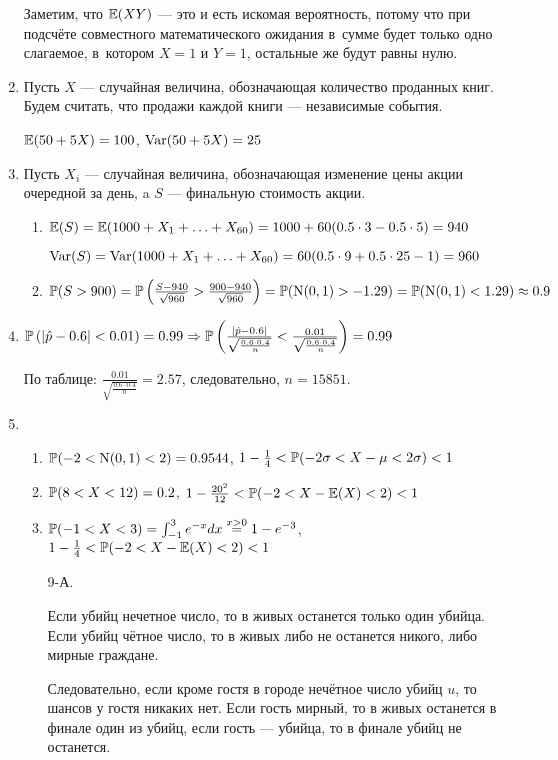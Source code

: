 \begin{enumerate}
Заметим, что $\E(XY)$ — это и есть искомая вероятность, потому что при подсчёте
совместного математического ожидания в~сумме будет только одно слагаемое, в~котором
$X = 1$ и $Y = 1$, остальные же будут равны нулю.
\item Пусть $X$ — случайная величина, обозначающая количество проданных книг.
Будем считать, что продажи каждой книги — независимые события.

$\E(50 + 5X) = 100$, $\Var(50 + 5X) = 25$
\item Пусть $X_i$ — случайная величина, обозначающая изменение цены акции очередной за день,
a $S$ —  финальную стоимость акции.
\begin{enumerate}
\item $\E(S) = \E(1000 + X_1 + \ldots + X_{60}) = 1000 + 60 (0.5 \cdot 3 - 0.5 \cdot 5) = 940$

$\Var(S) = \Var(1000 + X_1 + \ldots + X_{60}) = 60(0.5 \cdot 9 + 0.5 \cdot 25 - 1) = 960$
\item $\P(S > 900) = \P\left(\frac{S-940}{\sqrt{960}} > \frac{900-940}{\sqrt{960}} \right) =
\P(\cN(0,1) > -1.29) = \P(\cN(0, 1) < 1.29) \approx 0.9$
\end{enumerate}
\item $\P\left(|\hat{p} - 0.6| <0.01\right) = 0.99 \Rightarrow \P\left(\frac{|\hat{p}
- 0.6|}{\sqrt{\frac{0.6\cdot0.4}{n}}} < \frac{0.01}{\sqrt{\frac{0.6\cdot0.4}{n}}} \right) = 0.99 $

По таблице: $\frac{0.01}{\sqrt{\frac{0.6\cdot0.4}{n}}}  = 2.57$, следовательно, $n = 15851$.
\item
\begin{enumerate}
\item $\P(-2 < \cN(0,1) < 2) = 0.9544$, $1 - \frac{1}{4} < \P(-2\sigma<X-\mu<2\sigma) < 1$
\item $\P(8<X<12) = 0.2$, $1 - \frac{20^2}{12} < \P(-2 < X - \E(X) < 2)< 1$
\item $\P(-1 < X < 3) = \int_{-1}^{3} e^{-x} dx \stackrel{x>0}{=} 1 - e^{-3}$, $1- \frac{1}{4} < \P(-2<X-\E(X)<2) < 1$

\item[9-А.]

Если убийц нечетное число, то в живых останется только один убийца.
Если убийц чётное число, то в живых либо не останется никого, либо мирные граждане.

Следовательно, если кроме гостя в городе нечётное число убийц $u$, то шансов у гостя
никаких нет. Если гость мирный, то в живых останется в финале один из убийц,
если гость — убийца, то в финале убийц не останется.


\end{enumerate}
\end{enumerate}
